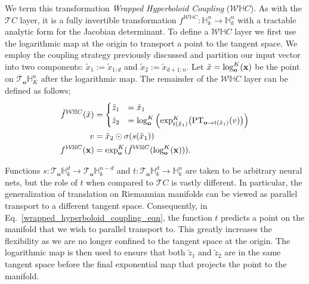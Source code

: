 We term this transformation {\em Wrapped Hyperboloid Coupling} ($\mathcal{W}\mathbb{H}C$). %
As with the $\mathcal{T}C$ layer, it is a fully invertible transformation $f^{\mathcal{W}\mathbb{H}C}: \mathbb{H}^n_k \to \mathbb{H}^n_k$ with a tractable analytic form for the Jacobian determinant. 
To define a $\mathcal{W}\mathbb{H}C$ layer we first use the logarithmic map at the origin to transport a point to the tangent space. We employ the coupling strategy previously discussed and partition our input vector into two components: $\tilde{x}_1:=\tilde{x}_{1:d}$ and $\tilde{x}_2:=\tilde{x}_{d+1:n}$. Let $\tilde{x} = \log_{\textbf{o}}^K(\mathbf{x})$ be the point on $\mathcal{T}_{\textbf{o}}\mathbb{H}^n_K$ after the logarithmic map. 
The remainder of the $\mathcal{W}\mathbb{H}C$ layer can be defined as follows;
\begin{align}
\label{wrapped_hyperboloid_coupling_eqn}
\tilde{f}^{\mathcal{W}\mathbb{H}C}(\tilde{x})&=
     \begin{cases}
     \tilde{z}_{1} &= \tilde{x}_{1}  \\
     \tilde{z}_{2} &= \log_{\textbf{o}}^K\Big( \textnormal{exp}_{t(\tilde{x}_{1})}^K\big(\textnormal{PT}_{\textbf{o}\to t(\tilde{x}_{1}) }(v)\big)\Big) \nonumber
    \end{cases}\\
    v &= \tilde{x}_{2} \odot \sigma(s(\tilde{x}_{1})) \nonumber \\
    f^{\mathcal{W}\mathbb{H}C}(\mathbf{x}) &=  \textnormal{exp}_{\textbf{o}}^K(\tilde{f}^{\mathcal{W}\mathbb{H}C}(\log_{\textbf{o}}^K(\mathbf{x}))).
\end{align}

Functions $s: \mathcal{T}_{\textbf{o}}\mathbb{H}^{d}_k \to \mathcal{T}_{\textbf{o}}\mathbb{H}^{n-d}_k$ and $t:\mathcal{T}_{\textbf{o}}\mathbb{H}^{d}_k \to \mathbb{H}^n_k$ are taken to be arbitrary neural nets, but the role of $t$ when compared to $\mathcal{T}C$ is vastly different. In particular, the generalization of translation on Riemannian manifolds can be viewed as parallel transport to a different tangent space. Consequently, in Eq.~\ref{wrapped_hyperboloid_coupling_eqn}, the function $t$ predicts a point on the manifold that we wish to parallel transport to.
This greatly increases the flexibility as we are no longer confined to the tangent space at the origin. The logarithmic map is then used to ensure that both $\tilde{z}_1$ and $\tilde{z}_2$ are in the same tangent space before the final exponential map that projects the point to the manifold.


